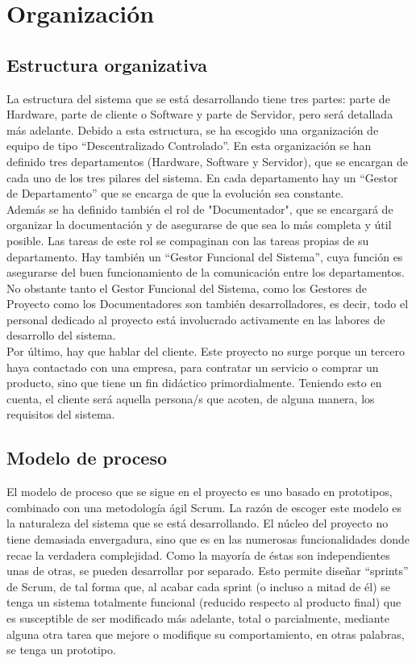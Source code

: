 \chapter{Organización}
\section{Estructura organizativa}
La estructura del sistema que se está desarrollando tiene tres partes: parte de Hardware, parte de cliente o Software y parte de Servidor, pero será detallada más adelante.
Debido a esta estructura, se ha escogido una organización de equipo de tipo ``Descentralizado Controlado''.
En esta organización se han definido tres departamentos (Hardware, Software y Servidor), que se encargan de cada uno de los tres pilares del sistema. En cada departamento hay un ``Gestor de Departamento'' que se encarga de que la evolución sea constante.\\

Además se ha definido también el rol de "Documentador", que se encargará de organizar la documentación y de asegurarse de que sea lo más completa y útil posible. Las tareas de este rol se compaginan con las tareas propias de su departamento.
Hay también un ``Gestor Funcional del Sistema'', cuya función es asegurarse del buen funcionamiento de la comunicación entre los departamentos.\\

No obstante tanto el Gestor Funcional del Sistema, como los Gestores de Proyecto como los Documentadores son también desarrolladores, es decir, todo el personal dedicado al proyecto está involucrado activamente en las labores de desarrollo del sistema.\\

Por último, hay que hablar del cliente. Este proyecto no surge porque un tercero haya contactado con una empresa, para contratar un servicio o comprar un producto, sino que tiene un fin didáctico primordialmente. Teniendo esto en cuenta, el cliente será aquella persona/s que acoten, de alguna manera, los requisitos del sistema.
\section{Modelo de proceso}
El modelo de proceso que se sigue en el proyecto es uno basado en prototipos, combinado con una metodología ágil Scrum.
La razón de escoger este modelo es la naturaleza del sistema que se está desarrollando. El núcleo del proyecto no tiene demasiada envergadura,  sino que es en las numerosas funcionalidades donde recae la verdadera complejidad. Como la mayoría de éstas son independientes unas de otras, se pueden desarrollar por separado. Esto permite diseñar ``sprints'' de Scrum, de tal forma que, al acabar cada sprint (o incluso a mitad de él) se tenga un sistema totalmente funcional (reducido respecto al producto final) que es susceptible de ser modificado más adelante, total o parcialmente, mediante alguna otra tarea que mejore o modifique su comportamiento, en otras palabras, se tenga un prototipo.\\

